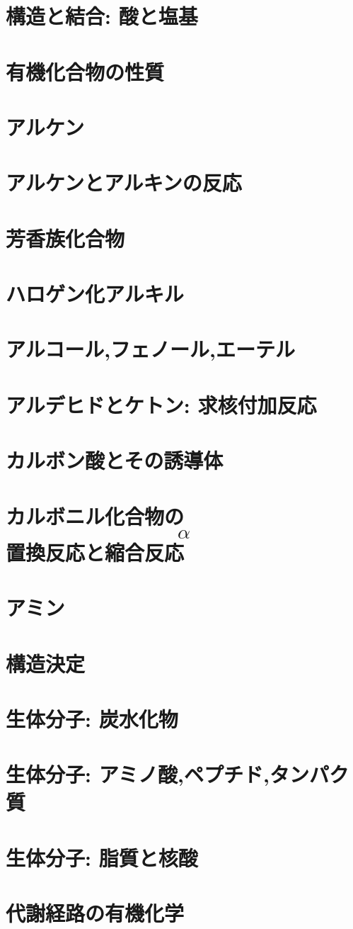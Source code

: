 \documentclass[dvipdfmx,uplatex]{jsarticle}
\begin{document}
\section{構造と結合: 酸と塩基}
\section{有機化合物の性質}
\section{アルケン}
\section{アルケンとアルキンの反応}
\section{芳香族化合物}
\section{ハロゲン化アルキル}
\section{アルコール,フェノール,エーテル}
\section{アルデヒドとケトン: 求核付加反応}
\section{カルボン酸とその誘導体}
\section{カルボニル化合物の$$\alpha$$置換反応と縮合反応}
\section{アミン}
\section{構造決定}
\section{生体分子: 炭水化物}
\section{生体分子: アミノ酸,ペプチド,タンパク質}
\section{生体分子: 脂質と核酸}
\section{代謝経路の有機化学}
\end{document}
